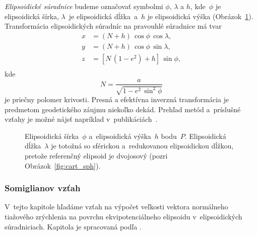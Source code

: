 \documentclass[a4paper,12pt]{book}
\begin{document}
\emph{Elipsoidické súradnice} budeme označovať symbolmi $\phi$, $\lambda$ 
a $h$, kde~$\phi$ je elipsoidická šírka, $\lambda$~je elipsoidická dĺžka~a~$h$ 
je elipsoidická výška (Obrázok~\ref{fig:ell_coords}).  Transformácia 
elipsoidických súradníc na pravouhlé súradnice má tvar 
\parencite{MoritzPhysicalGeodesy}
%
\begin{equation}
\begin{split}
x &= (N + h) \, \cos\phi \, \cos\lambda{,}\\
y &= (N + h) \, \cos\phi \, \sin\lambda{,}\\
z &= \left[ N \, (1 - e^2) + h \right] \, \sin\phi{,}\\
\end{split}
\end{equation}
%
kde
%
\begin{equation}
N = \frac{a}{\sqrt{1 - e^2 \, \sin^2\phi}}
\end{equation}
%
je priečny polomer krivosti.  Presná a efektívna inverzná transformácia je 
predmetom geodetického záujmu niekoľko dekád.  Prehľad metód a~príslušné vzťahy 
je možné nájsť napríklad v~publikáciách~\textcite{Fukushima2006,Claessens2019}.

\begin{figure}[bt]
\centering

\caption{Elipsoidická šírka~$\phi$ a~elipsoidická výška~$h$ bodu~$P$.  
Elipsoidická dĺžka~$\lambda$ je totožná so sférickou a~redukovanou 
elipsoidickou dĺžkou, pretože referenčný elipsoid je dvojosový (pozri 
Obrázok~\ref{fig:cart_sph}).}
\label{fig:ell_coords}
\end{figure}

\subsubsection{Somiglianov vzťah}
\label{sec:somigliana}

V~tejto kapitole hľadáme vzťah na výpočet veľkosti vektora normálneho tiažového 
zrýchlenia na povrchu ekvipotenciálneho elipsoidu v~elipsoidických 
súradniciach.  Kapitola je spracovaná podľa \textcite{MoritzPhysicalGeodesy}.
\end{document}
